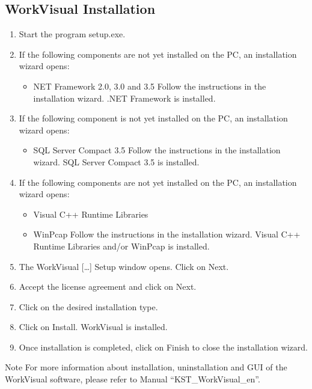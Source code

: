 	\subsection{WorkVisual Installation}
		\begin{enumerate}
			\item Start the program setup.exe.
			\item If the following components are not yet installed on the PC, an installation wizard opens:
				\begin{itemize}
					\item NET Framework 2.0, 3.0 and 3.5
					Follow the instructions in the installation wizard. .NET Framework is installed.
				\end{itemize}
			
			\item If the following component is not yet installed on the PC, an installation wizard opens:
				\begin{itemize}
				\item SQL Server Compact 3.5
				Follow the instructions in the installation wizard. SQL Server Compact 3.5 is installed.
				\end{itemize}
			
			\item If the following components are not yet installed on the PC, an installation wizard opens:
				\begin{itemize}
					\item Visual C++ Runtime Libraries
					\item WinPcap
					Follow the instructions in the installation wizard. Visual C++ Runtime Libraries	and/or WinPcap is installed.
				\end{itemize}
			\item The WorkVisual […] Setup window opens. Click on Next.
			\item Accept the license agreement and click on Next.
			\item Click on the desired installation type.
			\item Click on Install. WorkVisual is installed.	
			\item Once installation is completed, click on Finish to close the installation wizard.
		\end{enumerate}
    \begin{mynotebox}{Note}
	For more information about installation, uninstallation and GUI of the WorkVisual software, please refer to Manual “KST\_WorkVisual\_en”.
    \end{mynotebox}
    
